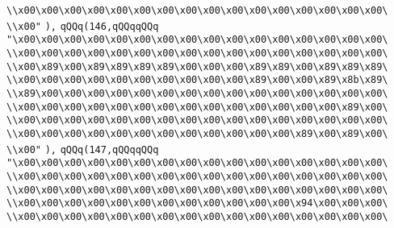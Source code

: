 \verb|\\x00\x00\x00\x00\x00\x00\x00\x00\x00\x00\x00\x00\x00\x00\x00\x00\|\newline
\verb|\\x00"|\newline
\verb|),|\newline
\verb|qQQq(146,qQQqqQQq|\newline
\verb|"\x00\x00\x00\x00\x00\x00\x00\x00\x00\x00\x00\x00\x00\x00\x00\x00\|\newline
\verb|\\x00\x00\x00\x00\x00\x00\x00\x00\x00\x00\x00\x00\x00\x00\x00\x00\|\newline
\verb|\\x00\x89\x00\x89\x89\x89\x89\x00\x00\x00\x89\x89\x00\x89\x89\x89\|\newline
\verb|\\x00\x00\x00\x00\x00\x00\x00\x00\x00\x00\x89\x00\x00\x89\x8b\x89\|\newline
\verb|\\x89\x00\x00\x00\x00\x00\x00\x00\x00\x00\x00\x00\x00\x00\x00\x00\|\newline
\verb|\\x00\x00\x00\x00\x00\x00\x00\x00\x00\x00\x00\x00\x00\x00\x89\x00\|\newline
\verb|\\x00\x00\x00\x00\x00\x00\x00\x00\x00\x00\x00\x00\x00\x00\x00\x00\|\newline
\verb|\\x00\x00\x00\x00\x00\x00\x00\x00\x00\x00\x00\x00\x89\x00\x89\x00\|\newline
\verb|\\x00"|\newline
\verb|),|\newline
\verb|qQQq(147,qQQqqQQq|\newline
\verb|"\x00\x00\x00\x00\x00\x00\x00\x00\x00\x00\x00\x00\x00\x00\x00\x00\|\newline
\verb|\\x00\x00\x00\x00\x00\x00\x00\x00\x00\x00\x00\x00\x00\x00\x00\x00\|\newline
\verb|\\x00\x00\x00\x00\x00\x00\x00\x00\x00\x00\x00\x00\x00\x00\x00\x00\|\newline
\verb|\\x00\x00\x00\x00\x00\x00\x00\x00\x00\x00\x00\x00\x94\x00\x00\x00\|\newline
\verb|\\x00\x00\x00\x00\x00\x00\x00\x00\x00\x00\x00\x00\x00\x00\x00\x00\|\newline
